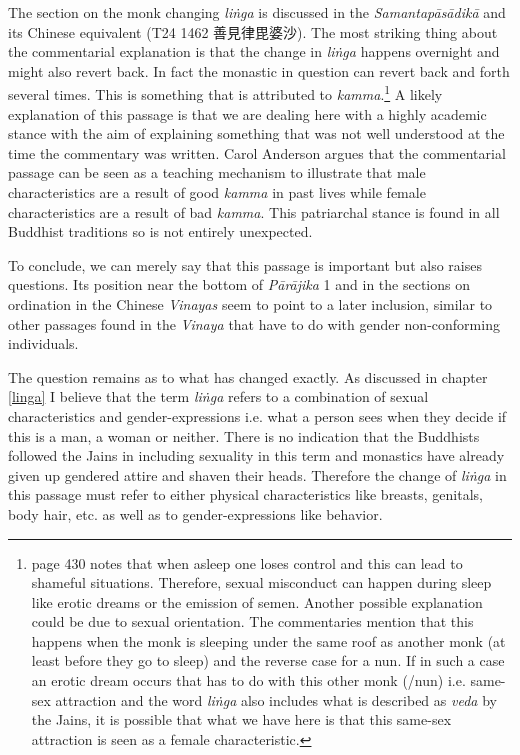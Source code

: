The section on the monk changing \textit{liṅga} is discussed in the \textit{Samantapāsādikā} and its Chinese equivalent (T24 1462 善見律毘婆沙). The most striking thing about the commentarial explanation is that the change in \textit{liṅga} happens overnight and might also revert back. In fact the monastic in question can revert back and forth several times. This is something that is attributed to \textit{kamma}.\footnote{\cite{heirman} page 430 notes that when asleep one loses control and this can lead to shameful situations. Therefore, sexual misconduct can happen during sleep like erotic dreams or the emission of semen. Another possible explanation could be due to sexual orientation. The commentaries mention that this happens when the monk is sleeping under the same roof as another monk (at least before they go to sleep) and the reverse case for a nun. If in such a case an erotic dream occurs that has to do with this other monk (/nun) i.e. same-sex attraction and the word \textit{liṅga} also includes what is described as \textit{veda} by the Jains, it is possible that what we have here is that this same-sex attraction is seen as a female characteristic.} A likely explanation of this passage is that we are dealing here with a highly academic stance with the aim of explaining something that was not well understood at the time the commentary was written. Carol Anderson argues that the commentarial passage can be seen as a teaching mechanism to illustrate that male characteristics are a result of good \textit{kamma} in past lives while female characteristics are a result of bad \textit{kamma}. This patriarchal stance is found in all Buddhist traditions so is not entirely unexpected. 

To conclude, we can merely say that this passage is important but also raises questions. Its position near the bottom of \textit{Pārājika} 1 and in the sections on ordination in the Chinese \textit{Vinayas} seem to point to a later inclusion, similar to other passages found in the \textit{Vinaya} that have to do with gender non-conforming individuals. 

The question remains as to what has changed exactly. As discussed in chapter \ref{linga} I believe that the term \textit{liṅga} refers to a combination of sexual characteristics and gender-expressions i.e. what a person sees when they decide if this is a man, a woman or neither. There is no indication that the Buddhists followed the Jains in including sexuality in this term and monastics have already given up gendered attire and shaven their heads. Therefore the change of \textit{liṅga} in this passage must refer to either physical characteristics like breasts, genitals, body hair, etc. as well as to gender-expressions like behavior.

